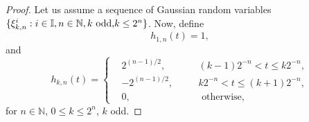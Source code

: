 \documentclass[10pt,a4paper]{amsart}
\newcommand{\N}{\mathbb{N}}
\begin{document}
\begin{proof}
	Let us assume a sequence of Gaussian random variables $\{\xi_{k,n}^i:i\in \mathbb{I},n\in\N, k \text{ odd,}\break k\leq 2^n\}$. 
	Now, define 
	\begin{equation*}
		h_{1,n}(t)=1,
			\end{equation*}and
			\begin{equation*}
	h_{k,n}(t)=
		\left\{\begin{aligned}
			&2^{(n-1)/2}, \quad &&(k-1)2^{-n}<t\leq k2^{-n},\\
			&-2^{(n-1)/2}, \quad  &&k2^{-n}<t\leq (k+1)2^{-n},\\
			&0, &&  \text{ otherwise},
		\end{aligned}
	\right.
	\end{equation*}for $n\in\N$, $0\leq k\leq 2^n$, $k$ odd. 


\end{proof}
\end{document}
